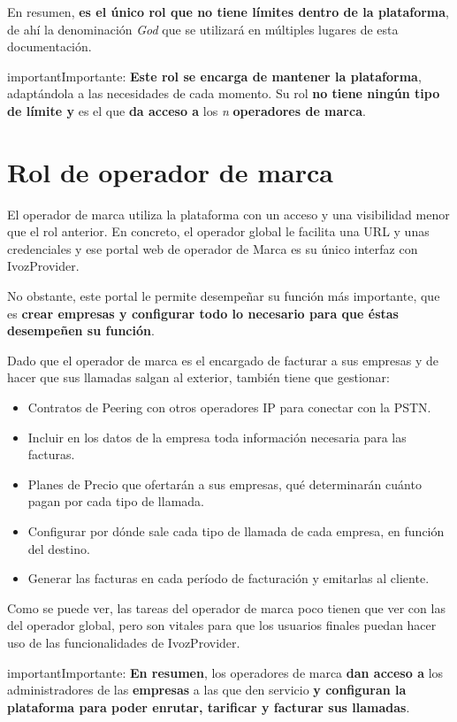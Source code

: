 \documentclass[letterpaper,10pt,spanish]{sphinxmanual}
\begin{document}
En resumen, \textbf{es el único rol que no tiene límites dentro de la plataforma}, de ahí la denominación \emph{God} que se utilizará en múltiples lugares de esta documentación.

\begin{notice}{important}{Importante:}
\textbf{Este rol se encarga de mantener la plataforma}, adaptándola a las necesidades de cada momento. Su rol \textbf{no tiene ningún tipo de límite y} es el que \textbf{da acceso a} los \emph{n} \textbf{operadores de marca}.
\end{notice}


\section{Rol de operador de marca}
\label{operation_roles/index:rol-de-operador-de-marca}
El operador de marca utiliza la plataforma con un acceso y una visibilidad menor que el rol anterior. En concreto, el operador global le facilita una URL y unas credenciales y ese portal web de operador de Marca es su único interfaz con IvozProvider.

No obstante, este portal le permite desempeñar su función más importante, que es \textbf{crear empresas y configurar todo lo necesario para que éstas desempeñen su función}.

Dado que el operador de marca es el encargado de facturar a sus empresas y de hacer que sus llamadas salgan al exterior, también tiene que gestionar:
\begin{itemize}
\item {} 
Contratos de Peering con otros operadores IP para conectar con la PSTN.

\item {} 
Incluir en los datos de la empresa toda información necesaria para las facturas.

\item {} 
Planes de Precio que ofertarán a sus empresas, qué determinarán cuánto pagan por cada tipo de llamada.

\item {} 
Configurar por dónde sale cada tipo de llamada de cada empresa, en función del destino.

\item {} 
Generar las facturas en cada período de facturación y emitarlas al cliente.

\end{itemize}

Como se puede ver, las tareas del operador de marca poco tienen que ver con las del operador global, pero son vitales para que los usuarios finales puedan hacer uso de las funcionalidades de IvozProvider.
\label{operation_roles/index:brand-responsibilities}
\begin{notice}{important}{Importante:}
\textbf{En resumen}, los operadores de marca \textbf{dan acceso a} los administradores de las \textbf{empresas} a las que den servicio \textbf{y configuran la plataforma para poder enrutar, tarificar y facturar sus llamadas}.
\end{notice}
\end{document}
